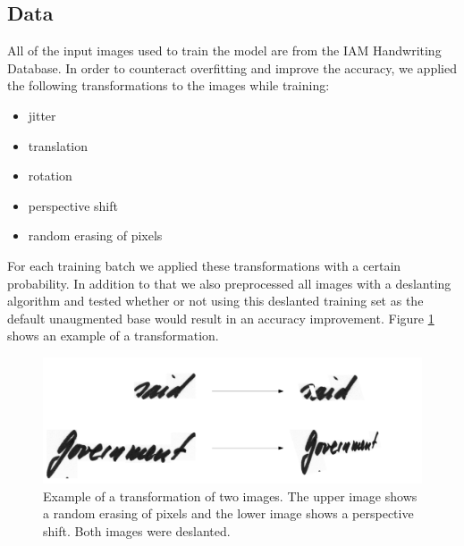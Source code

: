 \documentclass{article}
\begin{document}
\subsection{Data}
All of the input images used to train the model are from the IAM Handwriting Database\cite{IAM}.
In order to counteract overfitting and improve the accuracy, we applied the following transformations to the images while training: 
\begin{itemize}
\item jitter
\item translation
\item rotation
\item perspective shift
\item random erasing of pixels
\end{itemize}
For each training batch we applied these transformations with a certain probability. In addition to that we also preprocessed all images with a deslanting algorithm and tested whether or not using this deslanted training set as the default unaugmented base would result in an accuracy improvement. Figure \ref{fig:augmentations} shows an example of a transformation.
\begin{figure}[H]
\begin{center}
\includegraphics[scale=0.3]{rsz_transform}
\end{center}
\caption{Example of a transformation of two images. The upper image shows a random erasing of pixels and the lower image shows a perspective shift. Both images were deslanted.}
\label{fig:augmentations}
\end{figure}
\end{document}
